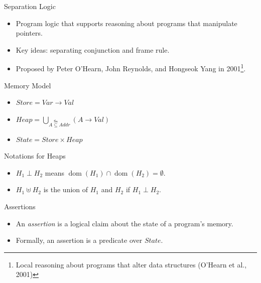 \documentclass{beamer}
\newcommand{\State}{\mathit{State}}
\newcommand{\Store}{\mathit{Store}}
\newcommand{\Heap}{\mathit{Heap}}
\newcommand{\Var}{\mathit{Var}}
\newcommand{\Val}{\mathit{Val}}
\newcommand{\Addr}{\mathit{Addr}}
\begin{document}
\begin{frame}{Separation Logic}
  \begin{itemize}
    \item Program logic that supports reasoning about programs that manipulate pointers.
    \item Key ideas: separating conjunction and frame rule.
    \item Proposed by Peter O'Hearn, John Reynolds, and Hongseok Yang in 2001\footnote{Local reasoning about programs that alter data structures (O'Hearn et al., 2001)}.
  \end{itemize}
\end{frame}

\begin{frame}{Memory Model}
  \begin{itemize}
    \item $\Store = \Var \to \Val$
    \item $\Heap = \displaystyle\bigcup_{A\overset{\mathsf{fin}}{\subseteq}\Addr}
      (A\to\Val)$
    \item $\State = \Store \times \Heap$
  \end{itemize}
\end{frame}

\begin{frame}{Notations for Heaps}
  \begin{itemize}
    \item $H_{1}\perp H_{2}$ means
      $\operatorname{dom}(H_{1})\cap\operatorname{dom}(H_{2})=\emptyset$.
    \item $H_{1}\uplus H_{2}$ is the union of $H_{1}$ and $H_{2}$ if
      $H_{1}\perp H_{2}$.
  \end{itemize}
\end{frame}

\begin{frame}{Assertions}
  \begin{itemize}
    \item An \emph{assertion} is a logical claim about the state of a program's memory.
    \item Formally, an assertion is a predicate over $\State$.
  \end{itemize}
\end{frame}
\end{document}
